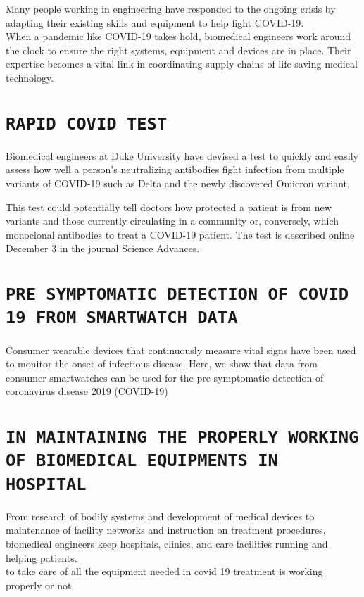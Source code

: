 \documentclass[12pt]{article}
\begin{document}
Many people working in engineering have responded to the ongoing crisis by adapting their existing skills and equipment to help fight COVID-19. \\


When a pandemic like COVID-19 takes hold, biomedical engineers work around the clock to ensure the right systems, equipment and devices are in place. Their expertise becomes a vital link in coordinating supply chains of life-saving medical technology.

\section{\Large\centering\texttt{RAPID COVID TEST}}
Biomedical engineers at Duke University have devised a test to quickly and easily assess how well a person’s neutralizing antibodies fight infection from multiple variants of COVID-19 such as Delta and the newly discovered Omicron variant.

This test could potentially tell doctors how protected a patient is from new variants and those currently circulating in a community or, conversely, which monoclonal antibodies to treat a COVID-19 patient. The test is described online December 3 in the journal Science Advances.

\section{\Large\centering\texttt{PRE SYMPTOMATIC DETECTION OF COVID 19 FROM SMARTWATCH DATA}}

Consumer wearable devices that continuously measure vital signs have been used to monitor the onset of infectious disease. Here, we show that data from consumer smartwatches can be used for the pre-symptomatic detection of coronavirus disease 2019 (COVID-19)\\


\section{\Large\centering\texttt{IN MAINTAINING THE PROPERLY WORKING OF BIOMEDICAL EQUIPMENTS IN HOSPITAL}}

From research of bodily systems and development of medical devices to maintenance of facility networks and instruction on treatment procedures, biomedical engineers keep hospitals, clinics, and care facilities running and helping patients.\\
to take care of all the equipment needed in covid 19 treatment is working properly or not.\\
\end{document}
